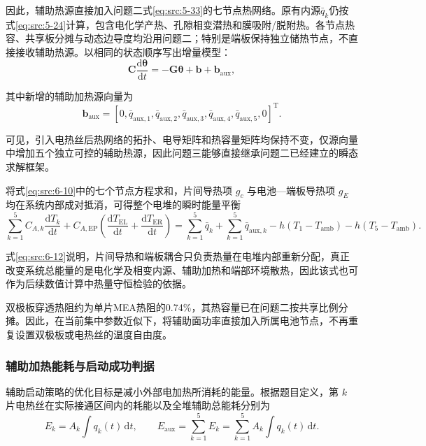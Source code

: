 \documentclass[bwprint]{gmcmthesis}
\numberwithin{equation}{section}
\numberwithin{figure}{section}
\begin{document}
 因此，辅助热源直接加入问题二式\eqref{eq:src:5-33}的七节点热网络。原有内源$\bar q_k$仍按式\eqref{eq:src:5-24}计算，包含电化学产热、孔隙相变潜热和膜吸附/脱附热。各节点热容、共享板分摊与动态边导度均沿用问题二；特别是端板保持独立储热节点，不直接接收辅助热源。以相同的状态顺序写出增量模型：
\begin{equation}
\mathbf{C} \frac{\text{d}\boldsymbol{\theta}}{\text{d}t} = -\mathbf{G}\boldsymbol{\theta} + \mathbf{b} + \mathbf{b}_{\text{aux}}, \label{eq:src:6-10}
\end{equation}

 其中新增的辅助加热源向量为
\begin{equation}
\mathbf{b}_{\text{aux}} = [0, \bar{q}_{\text{aux},1}, \bar{q}_{\text{aux},2}, \bar{q}_{\text{aux},3}, \bar{q}_{\text{aux},4}, \bar{q}_{\text{aux},5}, 0]^{\text{T}}. \label{eq:src:6-11}
\end{equation}

 可见，引入电热丝后热网络的拓扑、电导矩阵和热容量矩阵均保持不变，仅源向量中增加五个独立可控的辅助热源，因此问题三能够直接继承问题二已经建立的瞬态求解框架。


 将式\eqref{eq:src:6-10}中的七个节点方程求和，片间导热项 \(g_c\) 与电池—端板导热项 \(g_E\) 均在系统内部成对抵消，可得整个电堆的瞬时能量平衡
\begin{equation}
\sum_{k=1}^5 C_{A,k} \frac{\text{d}T_k}{\text{d}t} + C_{A,\text{EP}} \left( \frac{\text{d}T_{\text{EL}}}{\text{d}t} + \frac{\text{d}T_{\text{ER}}}{\text{d}t} \right) = \sum_{k=1}^5 \bar{q}_k + \sum_{k=1}^5 \bar{q}_{\text{aux},k} - h(T_1 - T_{\text{amb}}) - h(T_5 - T_{\text{amb}}). \label{eq:src:6-12}
\end{equation}

 式\eqref{eq:src:6-12}说明，片间导热和端板耦合只负责热量在电堆内部重新分配，真正改变系统总能量的是电化学及相变内源、辅助加热和端部环境散热，因此该式也可作为后续数值计算中热量守恒检验的依据。

 双极板穿透热阻约为单片MEA热阻的0.74\%，其热容量已在问题二按共享比例分摊。因此，在当前集中参数近似下，将辅助面功率直接加入所属电池节点，不再重复设置双极板或电热丝的温度自由度。

\subsubsection{辅助加热能耗与启动成功判据}

 辅助启动策略的优化目标是减小外部电加热所消耗的能量。根据题目定义，第 \(k\) 片电热丝在实际接通区间内的耗能以及全堆辅助总能耗分别为
\begin{equation}
E_k = A_k \int q_k(t) \, \text{d}t, \qquad E_{\text{aux}} = \sum_{k=1}^5 E_k = \sum_{k=1}^5 A_k \int q_k(t) \, \text{d}t. \label{eq:src:6-14}
\end{equation}
\end{document}
